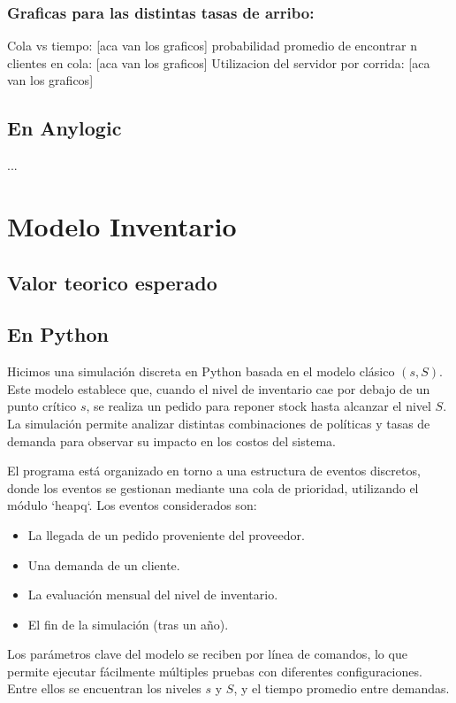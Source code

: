 \documentclass{article}
\begin{document}
\subsubsection{Graficas para las distintas tasas de arribo:}
Cola vs tiempo:
[aca van los graficos]
probabilidad promedio de encontrar n clientes en cola:
[aca van los graficos]
Utilizacion del servidor por corrida:
[aca van los graficos]

\subsection{En Anylogic}
...

\section{Modelo Inventario}

\subsection{Valor teorico esperado}

\subsection{En Python}
Hicimos una simulación discreta en Python basada en el modelo clásico \((s, S)\). Este modelo establece que, cuando el nivel de inventario cae por debajo de un punto crítico \( s \), se realiza un pedido para reponer stock hasta alcanzar el nivel \( S \). La simulación permite analizar distintas combinaciones de políticas y tasas de demanda para observar su impacto en los costos del sistema.

El programa está organizado en torno a una estructura de eventos discretos, donde los eventos se gestionan mediante una cola de prioridad, utilizando el módulo `heapq`. Los eventos considerados son:

\begin{itemize}
    \item La llegada de un pedido proveniente del proveedor.
    \item Una demanda de un cliente.
    \item La evaluación mensual del nivel de inventario.
    \item El fin de la simulación (tras un año).
\end{itemize} 

Los parámetros clave del modelo se reciben por línea de comandos, lo que permite ejecutar fácilmente múltiples pruebas con diferentes configuraciones. Entre ellos se encuentran los niveles \( s \) y \( S \), y el tiempo promedio entre demandas.
\end{document}
